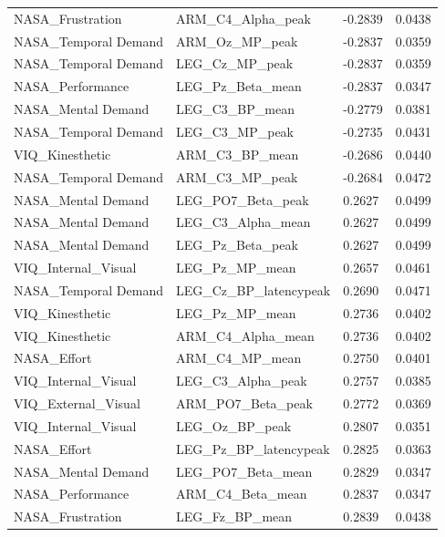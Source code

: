 \documentclass[10pt,letterpaper]{article}
\begin{document}
\begin{longtable}{@{}llll@{}}
NASA\_Frustration & ARM\_C4\_Alpha\_peak & -0.2839 & 0.0438 \\
\rowcolor[HTML]{EFEFEF} 
NASA\_Temporal Demand & ARM\_Oz\_MP\_peak & -0.2837 & 0.0359 \\
NASA\_Temporal Demand & LEG\_Cz\_MP\_peak & -0.2837 & 0.0359 \\
\rowcolor[HTML]{EFEFEF} 
NASA\_Performance & LEG\_Pz\_Beta\_mean & -0.2837 & 0.0347 \\
NASA\_Mental Demand & LEG\_C3\_BP\_mean & -0.2779 & 0.0381 \\
\rowcolor[HTML]{EFEFEF} 
NASA\_Temporal Demand & LEG\_C3\_MP\_peak & -0.2735 & 0.0431 \\
VIQ\_Kinesthetic & ARM\_C3\_BP\_mean & -0.2686 & 0.0440 \\
\rowcolor[HTML]{EFEFEF} 
NASA\_Temporal Demand & ARM\_C3\_MP\_peak & -0.2684 & 0.0472 \\
NASA\_Mental Demand & LEG\_PO7\_Beta\_peak & 0.2627 & 0.0499 \\
\rowcolor[HTML]{EFEFEF} 
NASA\_Mental Demand & LEG\_C3\_Alpha\_mean & 0.2627 & 0.0499 \\
NASA\_Mental Demand & LEG\_Pz\_Beta\_peak & 0.2627 & 0.0499 \\
\rowcolor[HTML]{EFEFEF} 
VIQ\_Internal\_Visual & LEG\_Pz\_MP\_mean & 0.2657 & 0.0461 \\
NASA\_Temporal Demand & LEG\_Cz\_BP\_latencypeak & 0.2690 & 0.0471 \\
\rowcolor[HTML]{EFEFEF} 
VIQ\_Kinesthetic & LEG\_Pz\_MP\_mean & 0.2736 & 0.0402 \\
VIQ\_Kinesthetic & ARM\_C4\_Alpha\_mean & 0.2736 & 0.0402 \\
\rowcolor[HTML]{EFEFEF} 
NASA\_Effort & ARM\_C4\_MP\_mean & 0.2750 & 0.0401 \\
VIQ\_Internal\_Visual & LEG\_C3\_Alpha\_peak & 0.2757 & 0.0385 \\
\rowcolor[HTML]{EFEFEF} 
VIQ\_External\_Visual & ARM\_PO7\_Beta\_peak & 0.2772 & 0.0369 \\
VIQ\_Internal\_Visual & LEG\_Oz\_BP\_peak & 0.2807 & 0.0351 \\
\rowcolor[HTML]{EFEFEF} 
NASA\_Effort & LEG\_Pz\_BP\_latencypeak & 0.2825 & 0.0363 \\
NASA\_Mental Demand & LEG\_PO7\_Beta\_mean & 0.2829 & 0.0347 \\
\rowcolor[HTML]{EFEFEF} 
NASA\_Performance & ARM\_C4\_Beta\_mean & 0.2837 & 0.0347 \\
NASA\_Frustration & LEG\_Fz\_BP\_mean & 0.2839 & 0.0438 \\

\end{longtable}
\end{document}
